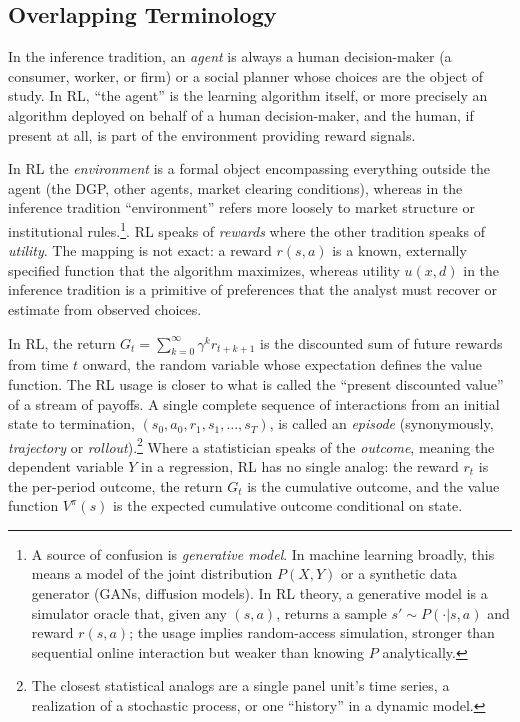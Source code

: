 \subsection{Overlapping Terminology}
\label{subsec:overlapping_terminology}

In the inference tradition, an \textit{agent} is always a human decision-maker (a consumer, worker, or firm) or a social planner whose choices are the object of study. In RL, ``the agent'' is the learning algorithm itself, or more precisely an algorithm deployed on behalf of a human decision-maker, and the human, if present at all, is part of the environment providing reward signals.

In RL the \textit{environment} is a formal object encompassing everything outside the agent (the DGP, other agents, market clearing conditions), whereas in the inference tradition ``environment'' refers more loosely to market structure or institutional rules.\footnote{A source of confusion is \textit{generative model}. In machine learning broadly, this means a model of the joint distribution $P(X, Y)$ or a synthetic data generator (GANs, diffusion models). In RL theory, a generative model is a simulator oracle that, given any $(s,a)$, returns a sample $s' \sim P(\cdot|s,a)$ and reward $r(s,a)$; the usage implies random-access simulation, stronger than sequential online interaction but weaker than knowing $P$ analytically.}. RL speaks of \textit{rewards} where the other tradition speaks of \textit{utility}. The mapping is not exact: a reward $r(s,a)$ is a known, externally specified function that the algorithm maximizes, whereas utility $u(x,d)$ in the inference tradition is a primitive of preferences that the analyst must recover or estimate from observed choices.

In RL, the return $G_t = \sum_{k=0}^{\infty} \gamma^k r_{t+k+1}$ is the discounted sum of future rewards from time $t$ onward, the random variable whose expectation defines the value function. The RL usage is closer to what is called the ``present discounted value'' of a stream of payoffs. A single complete sequence of interactions from an initial state to termination, $(s_0, a_0, r_1, s_1, \ldots, s_T)$, is called an \textit{episode} (synonymously, \textit{trajectory} or \textit{rollout}).\footnote{The closest statistical analogs are a single panel unit's time series, a realization of a stochastic process, or one ``history'' in a dynamic model.} Where a statistician speaks of the \textit{outcome}, meaning the dependent variable $Y$ in a regression, RL has no single analog: the reward $r_t$ is the per-period outcome, the return $G_t$ is the cumulative outcome, and the value function $V^\pi(s)$ is the expected cumulative outcome conditional on state.

